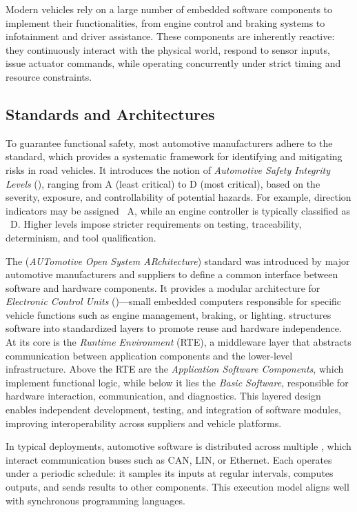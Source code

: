 Modern vehicles rely on a large number of embedded software components to implement their
functionalities, from engine control and braking systems to infotainment and driver assistance.
These components are inherently reactive: they continuously interact with the physical world,
respond to sensor inputs, issue actuator commands, while operating concurrently under strict timing
and resource constraints.

\subsection{Standards and Architectures}
\label{sec:intro:cars:standards}

To guarantee functional safety, most automotive manufacturers adhere to the \iso standard,
which provides a systematic framework for identifying and mitigating risks in road vehicles.
It introduces the notion of \emph{Automotive Safety Integrity Levels} (\Asil), ranging from A
(least critical) to D (most critical), based on the severity, exposure, and controllability
of potential hazards. For example, direction indicators may be assigned \Asil~A, while an
engine controller is typically classified as \Asil~D. Higher \Asil levels impose stricter
requirements on testing, traceability, determinism, and tool qualification.

The \ausar (\emph{AUTomotive Open System ARchitecture}) standard was introduced by major
automotive manufacturers and suppliers to define a common interface between software and hardware
components. It provides a modular architecture for \emph{Electronic Control Units} (\ecus)---small
embedded computers responsible for specific vehicle functions such as engine management, braking,
or lighting. \ausar structures software into standardized layers to promote reuse and hardware
independence. At its core is the \emph{Runtime Environment} (RTE), a middleware layer that
abstracts communication between application components and the lower-level infrastructure. Above
the RTE are the \emph{Application Software Components}, which implement functional logic, while
below it lies the \emph{Basic Software}, responsible for hardware interaction, communication,
and diagnostics. This layered design enables independent development, testing, and integration of
software modules, improving interoperability across suppliers and vehicle platforms.

In typical deployments, automotive software is distributed across multiple \ecus, which interact
\via communication buses such as CAN, LIN, or Ethernet. Each \ecu operates under a periodic
schedule: it samples its inputs at regular intervals, computes outputs, and sends results to other
components. This execution model aligns well with synchronous programming languages.

